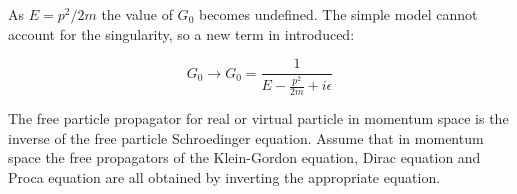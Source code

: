 As $E = p^2/2m$ the value of $G_0$ becomes undefined.  The simple model cannot account for the singularity, so a new term in introduced:

\[
  G_0 \to G_0 = \frac{1}{E - \frac{p^2}{2m} + i\epsilon}
\]

The free particle propagator for  real or virtual particle in momentum space is the inverse of the free particle Schroedinger equation.  Assume that in momentum space the free propagators of the Klein-Gordon equation, Dirac equation and Proca equation are all obtained by inverting the appropriate equation.
